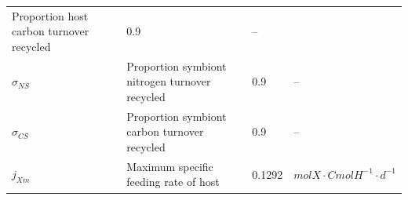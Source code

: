 \documentclass[]{elsarticle} %
\begin{document}
\begin{longtable}[c]{@{}llll@{}}
\begin{minipage}[t]{0.48\columnwidth}
Proportion host carbon turnover recycled
\strut\end{minipage} &
\begin{minipage}[t]{0.09\columnwidth}\raggedright\strut
0.9
\strut\end{minipage} &
\begin{minipage}[t]{0.23\columnwidth}\raggedright\strut
--
\strut\end{minipage}\tabularnewline
\begin{minipage}[t]{0.10\columnwidth}\raggedright\strut
\(\sigma_{NS}\)
\strut\end{minipage} &
\begin{minipage}[t]{0.48\columnwidth}\raggedright\strut
Proportion symbiont nitrogen turnover recycled
\strut\end{minipage} &
\begin{minipage}[t]{0.09\columnwidth}\raggedright\strut
0.9
\strut\end{minipage} &
\begin{minipage}[t]{0.23\columnwidth}\raggedright\strut
--
\strut\end{minipage}\tabularnewline
\begin{minipage}[t]{0.10\columnwidth}\raggedright\strut
\(\sigma_{CS}\)
\strut\end{minipage} &
\begin{minipage}[t]{0.48\columnwidth}\raggedright\strut
Proportion symbiont carbon turnover recycled
\strut\end{minipage} &
\begin{minipage}[t]{0.09\columnwidth}\raggedright\strut
0.9
\strut\end{minipage} &
\begin{minipage}[t]{0.23\columnwidth}\raggedright\strut
--
\strut\end{minipage}\tabularnewline
\begin{minipage}[t]{0.10\columnwidth}\raggedright\strut
\(j_{Xm}\)
\strut\end{minipage} &
\begin{minipage}[t]{0.48\columnwidth}\raggedright\strut
Maximum specific feeding rate of host
\strut\end{minipage} &
\begin{minipage}[t]{0.09\columnwidth}\raggedright\strut
0.1292
\strut\end{minipage} &
\begin{minipage}[t]{0.23\columnwidth}\raggedright\strut
\(molX \cdot CmolH^{-1} \cdot d^{-1}\)
\strut\end{minipage}\tabularnewline

\end{longtable}
\end{document}
